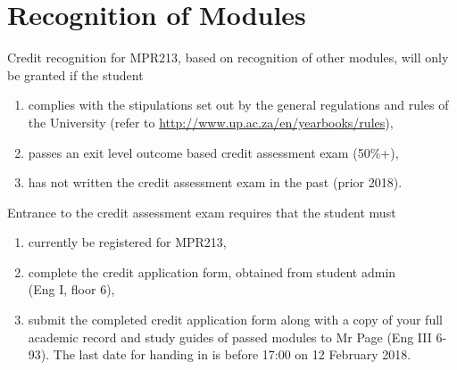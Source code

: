 \newpage
\section{Recognition of Modules} \label{sec:credit_study_guide}
    \noindent
    Credit recognition for MPR213, based on recognition of other modules, will
    only be granted if the student
    \begin{enumerate}
        \item complies with the stipulations set out by the general regulations
            and rules of the University (refer to
            \url{http://www.up.ac.za/en/yearbooks/rules}),
        \item passes an exit level outcome based credit assessment exam (50\%+),
        \item has not written the credit assessment exam in the past (prior 2018).
    \end{enumerate}

    \noindent
    Entrance to the credit assessment exam requires that the student must
    \begin{enumerate}
        \item currently be registered for MPR213,
        \item complete the credit application form, obtained from student
            admin \\ (Eng I, floor 6),
        \item submit the completed credit application form along with a copy of
            your full academic record and study guides of passed modules to Mr
            Page (Eng III 6-93). The last date for handing in is before 17:00
            on 12 February 2018.
    \end{enumerate}

